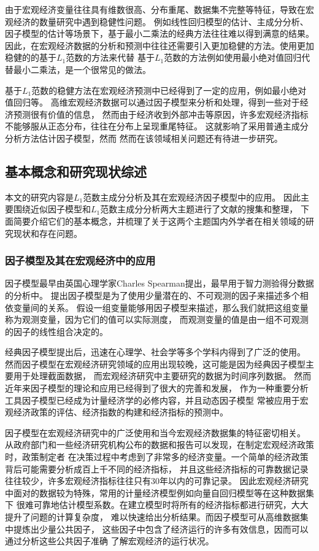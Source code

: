 由于宏观经济变量往往具有维数很高、分布重尾、数据集不完整等特征，导致在宏观经济的数量研究中遇到稳健性问题。
例如线性回归模型的估计、主成分分析、因子模型的估计等场景下，基于最小二乘法的经典方法往往难以得到满意的结果。
因此，在宏观经济数据的分析和预测中往往还需要引入更加稳健的方法。使用更加稳健的的基于$L_1$范数的方法来代替
基于$L_1$范数的方法例如使用最小绝对值回归代替最小二乘法，是一个很常见的做法。

基于$L_1$范数的稳健方法在宏观经济预测中已经得到了一定的应用，例如最小绝对值回归等。
高维宏观经济数据可以通过因子模型来分析和处理，得到一些对于经济预测很有价值的信息，
然而由于经济收到外部冲击等原因，许多宏观经济指标不能够服从正态分布，往往在分布上呈现重尾特征。
这就影响了采用普通主成分分析方法估计因子模型，然而
然而在该领域相关问题还有待进一步研究。

\subsection{基本概念和研究现状综述}
本文的研究内容是$L_1$范数主成分分析及其在宏观经济因子模型中的应用。
因此主要围绕近似因子模型和$L_1$范数主成分分析两大主题进行了文献的搜集和整理，
下面简要介绍它们的基本概念，并梳理了关于这两个主题国内外学者在相关领域的研究现状和存在问题。

\subsubsection{因子模型及其在宏观经济中的应用}
因子模型最早由英国心理学家Charles Spearman提出，最早用于智力测验得分数据的分析中。
提出因子模型是为了使用少量潜在的、不可观测的因子来描述多个相依变量间的关系。
假设一组变量能够用因子模型来描述，那么我们就把这组变量称为观测变量，因为它们的值可以实际测度，
而观测变量的值是由一组不可观测的因子的线性组合决定的。

经典因子模型提出后，迅速在心理学、社会学等多个学科内得到了广泛的使用。
然而因子模型在宏观经济研究领域的应用出现较晚，这可能是因为经典因子模型主要用于处理截面数据，
而宏观经济研究中主要研究的数据为时间序列数据。
然而近年来因子模型的理论和应用已经得到了很大的完善和发展，
作为一种重要分析工具因子模型已经成为计量经济学的必修内容，并且动态因子模型
常被应用于宏观经济政策的评估、经济指数的构建和经济指标的预测中。

因子模型在宏观经济研究中的广泛使用和当今宏观经济数据集的特征密切相关。
从政府部门和一些经济研究机构公布的数据和报告可以发现，在制定宏观经济政策时，政策制定者
在决策过程中考虑到了非常多的经济变量。一个简单的经济政策背后可能需要分析成百上千不同的经济指标，
并且这些经济指标的可靠数据记录往往较少，许多宏观经济指标往往只有30年以内的可靠记录。
因此宏观经济研究中面对的数据较为特殊，常用的计量经济模型例如向量自回归模型等在这种数据集下
很难可靠地估计模型系数。在建立模型时将所有的经济指标都进行研究，大大提升了问题的计算复杂度，
难以快速给出分析结果。而因子模型可从高维数据集中提炼出少量公共因子，
这些因子中包含了经济运行的许多有效信息，因而可以通过分析这些公共因子准确
了解宏观经济的运行状况。

